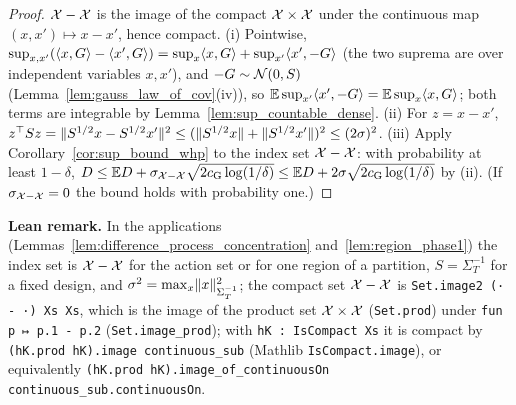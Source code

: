\begin{proof}
\leanok
{}
$\mathcal{X} - \mathcal{X}$ is the image of the compact $\mathcal{X}\times\mathcal{X}$ under the continuous map
$(x,x')\mapsto x - x'$, hence compact. (i) Pointwise,
$\sup_{x,x'}(\langle x, G \rangle - \langle x', G \rangle) = \sup_x\langle x, G \rangle + \sup_{x'}\langle x', -G \rangle$ (the two suprema
are over independent variables $x, x'$), and $-G \sim \mathcal{N}(0,S)$
(Lemma~\ref{lem:gauss_law_of_cov}(iv)), so $\mathbb{E}\sup_{x'}\langle x', -G \rangle = \mathbb{E}\sup_x\langle x, G \rangle$; both
terms are integrable by Lemma~\ref{lem:sup_countable_dense}. (ii) For $z = x - x'$,
$z^\top Sz = \lVert S^{1/2}x - S^{1/2}x' \rVert^2 \le (\lVert S^{1/2}x \rVert + \lVert S^{1/2}x' \rVert)^2 \le (2\sigma)^2$.
(iii) Apply Corollary~\ref{cor:sup_bound_whp} to the index set $\mathcal{X} - \mathcal{X}$: with probability
at least $1 - \delta$, $D \le \mathbb{E} D + \sigma_{\mathcal{X}-\mathcal{X}}\sqrt{2c_{\mathrm{G}}\log(1/\delta)} \le
\mathbb{E} D + 2\sigma\sqrt{2c_{\mathrm{G}}\log(1/\delta)}$ by (ii). (If $\sigma_{\mathcal{X} - \mathcal{X}} = 0$ the bound holds
with probability one.)
\end{proof}

\textbf{Lean remark.} In the applications (Lemmas~\ref{lem:difference_process_concentration}
and~\ref{lem:region_phase1}) the index set is $\mathcal{X} - \mathcal{X}$ for the action set or for one region
of a partition, $S = \Sigma_T^{-1}$ for a fixed design, and $\sigma^2 = \max_{x}\lVert x \rVert^2_{\Sigma_T^{-1}}$;
the compact set $\mathcal{X} - \mathcal{X}$ is \texttt{Set.image2 (· - ·) Xs Xs}, which is the image of the
product set $\mathcal{X}\times\mathcal{X}$ (\texttt{Set.prod}) under \texttt{fun p ↦ p.1 - p.2}
(\texttt{Set.image\_prod}); with \texttt{hK : IsCompact Xs} it is compact by
\texttt{(hK.prod hK).image continuous\_sub} (Mathlib \texttt{IsCompact.image}), or equivalently
\texttt{(hK.prod hK).image\_of\_continuousOn continuous\_sub.continuousOn}.
